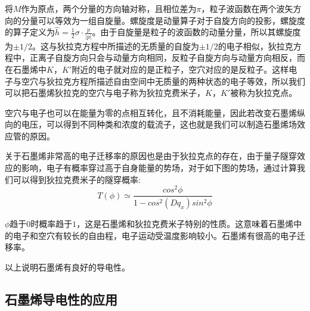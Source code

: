 将$M$作为原点，两个分量的方向轴对称，且相位差为$\pi$，粒子波函数在两个波矢方向的分量可以等效为一组自旋量。螺旋度是动量算子对于自旋方向的投影，螺旋度的算子定义为$\hat{h} =\frac{1}{2} \sigma \cdot \frac{p}{\left | p \right | }  $。由于自旋量是粒子的波函数的动量分量，所以其螺旋度为$\pm 1/2$。这与狄拉克方程中所描述的无质量的自旋为$\pm 1/2$的电子相似，狄拉克方程中，正离子自旋方向只会与动量方向相同，反粒子自旋方向与动量方向相反，而在石墨烯中$K$，$K'$附近的电子就对应的是正粒子，空穴对应的是反粒子。这样电子与空穴与狄拉克方程所描述自由空间中无质量的两种状态的电子等效，所以我们可以把石墨烯狄拉克的空穴与电子称为狄拉克费米子，$K$，$K'$被称为狄拉克点。\par
空穴与电子也可以在能量为零的点相互转化，且不消耗能量，因此若改变石墨烯纵向的电压，可以得到不同种类和浓度的载流子，这也就是我们可以制造石墨烯场效应管的原因。\par
关于石墨烯非常高的电子迁移率的原因也是由于狄拉克点的存在，由于量子隧穿效应的影响，电子有概率穿过高于自身能量的势场，对于如下图的势场，通过计算我们可以得到狄拉克费米子的隧穿概率:
\begin{equation}\label{...}
    T(\phi )\simeq \frac{cos^{2}\phi }{1-cos^{2}(Dq_{x})sin^{2} \phi }
\end{equation}
\par
$\phi$趋于$0$时概率趋于$1$，这是石墨烯和狄拉克费米子特别的性质。这意味着石墨烯中的电子和空穴有较长的自由程，电子运动受温度影响较小。石墨烯有很高的电子迁移率。\par
以上说明石墨烯有良好的导电性。\par



\subsection{石墨烯导电性的应用}
